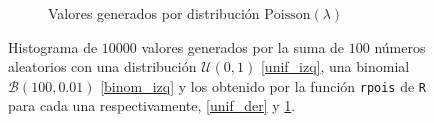 \documentclass[paper=leter, fontsize=11pt]{scrartcl}
\numberwithin{equation}{section}		%
\numberwithin{figure}{section}			%
\numberwithin{table}{section}				%
\begin{document}
\begin{figure}
\begin{subfigure}{0.5\textwidth}
        \caption{Valores generados por distribución $\text{Poisson}(\lambda)$}
        \label{binom_der}
    \end{subfigure}
    \caption{Histograma de $10000$ valores generados por la suma de $100$ números aleatorios con una distribución $\mathcal{U}(0, 1)$ \ref{unif_izq}, una binomial $\mathcal{B}(100, 0.01)$ \ref{binom_izq} y los obtenido por la función \texttt{rpois} de \texttt{R}  para cada una respectivamente, \ref{unif_der} y \ref{binom_der}.}
    \label{unif}
\end{figure}



\end{document}
